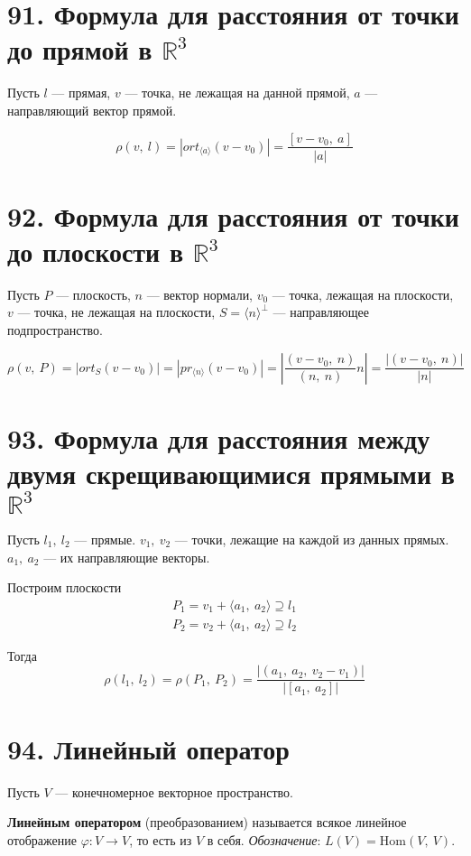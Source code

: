 \documentclass[a4paper, 12pt]{article}
\newcommand{\R}{\mathbb{R}}
\begin{document}
\section*{91. Формула для расстояния от точки до прямой в $\R^3$}
Пусть $l$ --- прямая, $v$ --- точка, не лежащая на данной прямой, $a$ --- направляющий вектор прямой.

\[
\rho(v,\ l) = |ort_{\langle a \rangle}(v - v_0)| = \dfrac{[v - v_0,\ a]}{|a|}
\]

\section*{92. Формула для расстояния от точки до плоскости в $\R^3$}
Пусть $P$ --- плоскость, $n$ --- вектор нормали, $v_0$ --- точка, лежащая на плоскости, $v$ --- точка, не лежащая на плоскости, $S = \langle n \rangle^\bot$ --- направляющее подпространство.

\[
\rho(v,\ P) = |ort_S(v - v_0)| = |pr_{\langle n \rangle}(v - v_0)| = \left|\dfrac{(v - v_0,\ n)}{(n,\ n)}n\right| = \dfrac{|(v - v_0,\ n)|}{|n|}
\]

\section*{93. Формула для расстояния между двумя скрещивающимися прямыми в $\R^3$}
Пусть $l_1,\ l_2$ --- прямые. $v_1,\ v_2$ --- точки, лежащие на каждой из данных прямых. $a_1,\ a_2$ --- их направляющие векторы.

Построим плоскости
\vspace{-2mm}
\begin{align*}
P_1 = v_1 + \langle a_1,\ a_2 \rangle \supseteq l_1 \\
P_2 = v_2 + \langle a_1,\ a_2 \rangle \supseteq l_2
\end{align*}

Тогда
\vspace{-2mm}
\[
\rho(l_1,\ l_2) = \rho(P_1,\ P_2) = \dfrac{|(a_1,\ a_2,\ v_2 - v_1)|}{|[a_1,\ a_2]|}
\]


\section*{94. Линейный оператор}
Пусть $V$ --- конечномерное векторное пространство.

\textbf{Линейным оператором} (преобразованием) называется всякое линейное отображение $\varphi: V \rightarrow V$, то есть из $V$ в себя. \textit{Обозначение}: $L(V) = \text{Hom}(V,\ V)$.
\end{document}
